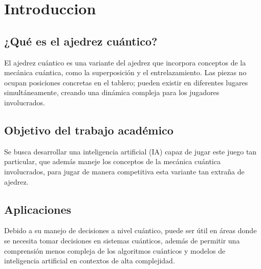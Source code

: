 \section{Introduccion}
\subsection{¿Qué es el ajedrez cuántico?}
El ajedrez cuántico es una variante del ajedrez que incorpora conceptos de la mecánica cuántica, como la superposición y el entrelazamiento. Las piezas no ocupan posiciones concretas en el tablero; pueden existir en diferentes lugares simultáneamente, creando una dinámica compleja para los jugadores involucrados.
\subsection{Objetivo del trabajo académico}
Se busca desarrollar una inteligencia artificial (IA) capaz de jugar este juego tan particular, que además maneje los conceptos de la mecánica cuántica involucrados, para jugar de manera competitiva esta variante tan extraña de ajedrez.

\subsection{Aplicaciones}
Debido a su manejo de decisiones a nivel cuántico, puede ser útil en áreas donde se necesita tomar decisiones en sistemas cuánticos, además de permitir una comprensión menos compleja de los algoritmos cuánticos y modelos de inteligencia artificial en contextos de alta complejidad.

